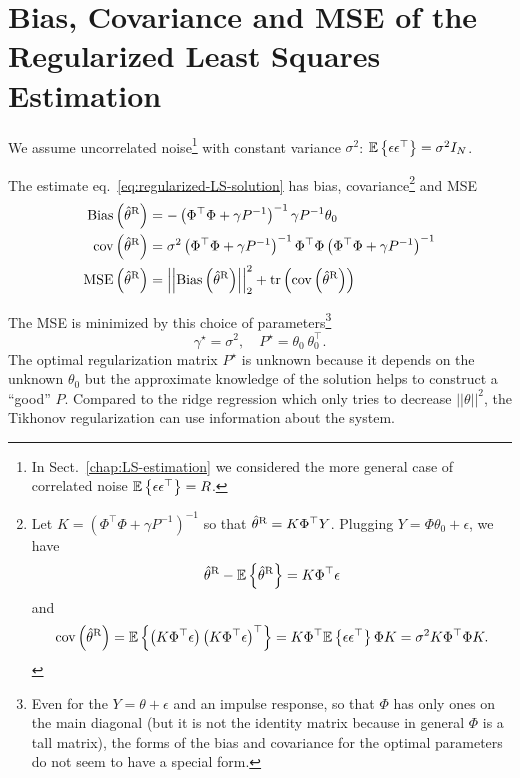 \section{Bias, Covariance and MSE of the Regularized Least Squares Estimation}
\label{sec:bias-covariance-MSE-regLS-estimation}

We assume uncorrelated noise\footnote{In Sect.~\ref{chap:LS-estimation} we considered the more general case of correlated noise $\mathbb{E}\left\{\epsilon \epsilon^\top\right\} = R$.} with constant variance $\sigma^2$: $\mathbb{E}\left\{\epsilon \epsilon^\top\right\} = \sigma^2I_N$.

The estimate eq.~\eqref{eq:regularized-LS-solution} has bias, covariance\footnote{Let $K = \left(\Phi^\top\Phi + \gamma P^{-1}\right)^{-1}$ so that $\hat{\theta}^\textrm{R} = K\Phi^\top Y$. Plugging $Y=\Phi\theta_0+\epsilon$, we have
  \begin{equation*}
    \hat{\theta}^\textrm{R} - \mathbb{E}\left\{\hat{\theta}^\textrm{R}\right\} = K\Phi^\top\epsilon
  \end{equation*}
  and
  \begin{equation*}
    \textrm{cov}\left(\hat{\theta}^\textrm{R}\right) = \mathbb{E}\left\{\left(K\Phi^\top\epsilon\right) \left(K\Phi^\top\epsilon\right)^\top\right\} = K\Phi^\top \mathbb{E}\left\{\epsilon\epsilon^\top\right\} \Phi K = \sigma^2 K\Phi^\top\Phi K.
  \end{equation*}} and MSE
\begin{align*}
  \textrm{Bias}\left(\hat{\theta}^\textrm{R}\right) &= -\left(\Phi^\top\Phi + \gamma P^{-1}\right)^{-1}\gamma P^{-1}\theta_0 \\
  \textrm{cov}\left(\hat{\theta}^\textrm{R}\right) &= \sigma^2 \left(\Phi^\top\Phi + \gamma P^{-1}\right)^{-1} \Phi^\top\Phi \left(\Phi^\top\Phi + \gamma P^{-1}\right)^{-1} \\
  \textrm{MSE}\left(\hat{\theta}^\textrm{R}\right) &= \left|\left|\textrm{Bias}\left(\hat{\theta}^\textrm{R}\right)\right|\right|_2^2 + \textrm{tr}\left(\textrm{cov}\left(\hat{\theta}^\textrm{R}\right)\right)
\end{align*}

The MSE is minimized by this choice of parameters\footnote{Even for the $Y=\theta+\epsilon$ and an impulse response, so that $\Phi$ has only ones on the main diagonal (but it is not the identity matrix because in general $\Phi$ is a tall matrix), the forms of the bias and covariance for the optimal parameters do not seem to have a special form.}
\begin{equation}
  \label{eq:regLS-optimal-parameters}
  \gamma^\star = \sigma^2,\hspace{1em} P^\star = \theta_0^{\phantom{\top}} \theta_0^\top.
\end{equation}
The optimal regularization matrix $P^\star$ is unknown because it depends on the unknown $\theta_0$ but the approximate knowledge of the solution helps to construct a ``good'' $P$. Compared to the ridge regression which only tries to decrease $||\theta||^2$, the Tikhonov regularization can use information about the system.

